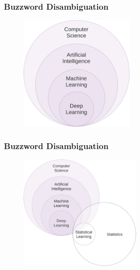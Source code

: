 \documentclass[11pt,
               aspectratio=169
               ]{beamer}
\begin{document}
		\begin{frame}
		
			\frametitle{Buzzword Disambiguation}
			
			\begin{figure}[htb]
				\begin{center}
					\includegraphics[height=165pt, angle=1]{img/cs.png}
					\label{fig:cs}
				\end{center}
			\end{figure}
		
		\end{frame}
			
		\begin{frame}
		
			\frametitle{Buzzword Disambiguation}
			
			\begin{figure}[htb]
				\begin{center}
					\includegraphics[height=165pt, angle=1]{img/cs_stat.png}
					\label{fig:cs}
				\end{center}
			\end{figure}
		
		\end{frame}
		
\end{document}
